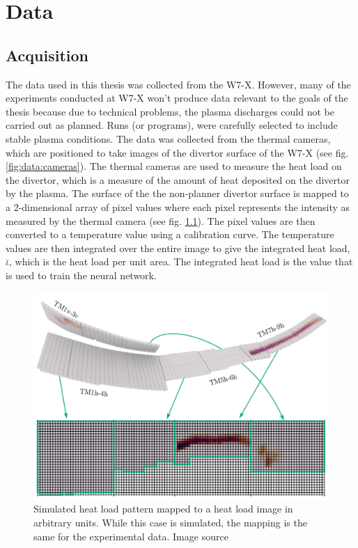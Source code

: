 
\chapter{Data}

\label{sec:Data Acquisition}
\section{Acquisition}

The data used in this thesis was collected from the W7-X. However, many of the experiments conducted at W7-X won't produce data relevant to the goals of the thesis because due to technical problems, the plasma discharges could not be carried out as planned. Runs (or programs), were carefully selected to include stable plasma conditions. The data was collected from the thermal cameras, which are positioned to take images of the divertor surface of the W7-X (see fig. \ref{fig:data:cameras}). The thermal cameras are used to measure the heat load on the divertor, which is a measure of the amount of heat deposited on the divertor by the plasma. The surface of the the non-planner divertor surface is mapped to a 2-dimensional array of pixel values where each pixel represents the intensity as measured by the thermal camera (see fig. \ref{fig:data:mapping}). The pixel values are then converted to a temperature value using a calibration curve. The temperature values are then integrated over the entire image to give the integrated heat load, $\bar{\iota}$, which is the heat load per unit area. The integrated heat load is the value that is used to train the neural network.

\begin{figure}[htb]
	\includegraphics[width=\textwidth]{images/mapping.png}
	\caption{Simulated heat load pattern mapped to a heat load image in arbitrary units. While this case is simulated, the mapping is the same for the experimental data. Image source \cite{Blatzheim_2019}}
	\label{fig:data:mapping}
\end{figure}

